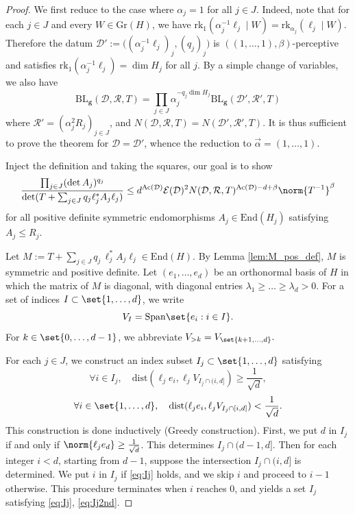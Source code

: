 \begin{proof}
We first reduce to the case where $\alpha_j = 1$ for all $j \in J$. Indeed, note that for each $j \in J$ and every $W \in \mathrm{Gr}(H)$, we have
$\mathrm{rk}_1( \alpha_j^{-1} \ell_j \mid W) = \mathrm{rk}_{\alpha_j}(\ell_j \mid W)$.
Therefore the datum $\mathcal{D}':=\bigl((\alpha_j^{-1} \ell_j)_j, (q_j)_j\bigr)$ is $((1,\dotsc,1), \beta)$-perceptive and satisfies $\mathrm{rk}_1( \alpha_j^{-1} \ell_j)=\dim H_{j}$ for all $j$.
By a simple change of variables, we also have
$$\mathrm{BL}_{\mathbf{g}}(\mathcal{D}, \mathcal{R}, T)=\prod_{j\in J} \alpha_{j}^{-q_{j}\dim H_{j}} \mathrm{BL}_{\mathbf{g}}(\mathcal{D}', \mathcal{R}', T)$$
 where $\mathcal{R}'=(\alpha_{j}^2 R_{j})_{j\in J}$, and $N(\mathcal{D}, \mathcal{R}, T)=N(\mathcal{D}', \mathcal{R}', T)$.
It is thus sufficient to prove the theorem for $\mathcal{D}=\mathcal{D}'$, whence the reduction to $\vec{\alpha}=(1,\dotsc,1)$.

Inject the definition and taking the squares, our goal is to show
\begin{equation}
\label{eq:rlub1}
\frac{\prod_{j\in J} (\det A_{j})^{q_{j}} }{\det(T + \sum_{j \in J} q_j \ell_j^* A_{j}\ell_j)}\leq d^{\mathrm{Ac}(\mathcal{D})}  \mathcal{E}(\mathcal{D})^2 N(\mathcal{D}, \mathcal{R}, T)^{\mathrm{Ac}(\mathcal{D})-d+\beta} \norm{T^{-1}}^{\beta}
\end{equation}
for all positive definite symmetric endomorphisms $A_j \in \mathrm{End}(H_j)$ satisfying $A_j \leq R_j$.

Let $M := T+ \sum_{j\in J} q_{j} \,\ell^*_{j} A_{j}\ell_{j} \in \mathrm{End}(H)$.
By Lemma \ref{lem:M_pos_def}, $M$ is symmetric and positive definite.
Let $(e_1, \dotsc, e_d)$ be an orthonormal basis of $H$ in which the matrix of $M$ is diagonal, with diagonal entries $\lambda_{1}\geq \dots \geq \lambda_{d}>0$.
For a set of indices $I \subset \set{1, \dotsc, d}$, we write
\[
V_I = \mathrm{Span} \set{ e_i : i \in I}.
\]
For $k \in \set{0,\dotsc, d-1}$, we abbreviate
\(
V_{> k} = V_{\set{k+1, \dotsc, d}}.
\)

For each $j \in J$, we construct an index subset $I_j \subset \set{1, \dotsc, d}$ satisfying
\begin{equation}
\label{eq:Ij}
\forall i \in I_{j}, \quad \mathrm{dist}(\ell_j e_i, \ell_j V_{I_j \cap (i,d] }) \geq \frac{1}{\sqrt{d}},
\end{equation}
\begin{equation}\label{eq:Ij2nd}
\forall i \in \set{1, \dotsc, d},\quad \mathrm{dist}(\ell_j e_i, \ell_j V_{I_j \cap [i,d]}) < \frac{1}{\sqrt{d}}.
\end{equation}
This construction is done inductively (Greedy construction).
First, we put $d$ in $I_j$ if and only if $\norm{\ell_j e_d} \geq \frac{1}{\sqrt{d}}$.
This determines $I_j \cap (d-1,d]$.
Then for each integer $i < d$, starting from $d - 1$, suppose the intersection $I_j \cap (i, d]$ is determined.
We put $i$ in $I_j$ if \eqref{eq:Ij} holds, and we skip $i$ and proceed to $i - 1$ otherwise.
This procedure terminates when $i$ reaches $0$, and yields a set $I_{j}$ satisfying \eqref{eq:Ij}, \eqref{eq:Ij2nd}.



\end{proof}
